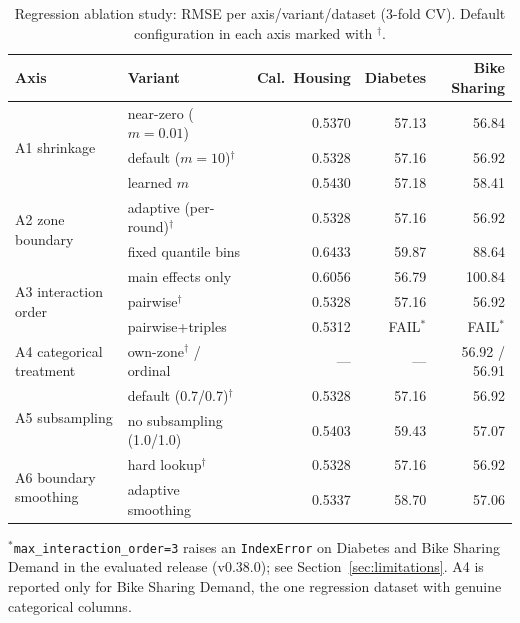 \documentclass[11pt]{article}
\begin{document}
\begin{table}[t]
\centering
\small
\caption{Regression ablation study: RMSE per axis/variant/dataset (3-fold
CV). Default configuration in each axis marked with $^\dagger$.}
\label{tab:ablation-reg}
\begin{tabular}{llrrr}
\toprule
Axis & Variant & Cal.\ Housing & Diabetes & Bike Sharing \\
\midrule
\multirow{3}{*}{A1 shrinkage}
 & near-zero ($m=0.01$)   & 0.5370 & 57.13 & 56.84 \\
 & default ($m=10$)$^\dagger$ & 0.5328 & 57.16 & 56.92 \\
 & learned $m$             & 0.5430 & 57.18 & 58.41 \\
\midrule
\multirow{2}{*}{A2 zone boundary}
 & adaptive (per-round)$^\dagger$ & 0.5328 & 57.16 & 56.92 \\
 & fixed quantile bins      & 0.6433 & 59.87 & 88.64 \\
\midrule
\multirow{3}{*}{A3 interaction order}
 & main effects only        & 0.6056 & 56.79 & 100.84 \\
 & pairwise$^\dagger$        & 0.5328 & 57.16 & 56.92 \\
 & pairwise+triples          & 0.5312 & FAIL$^*$ & FAIL$^*$ \\
\midrule
A4 categorical treatment & own-zone$^\dagger$ / ordinal & --- & --- & 56.92 / 56.91 \\
\midrule
\multirow{2}{*}{A5 subsampling}
 & default (0.7/0.7)$^\dagger$ & 0.5328 & 57.16 & 56.92 \\
 & no subsampling (1.0/1.0)   & 0.5403 & 59.43 & 57.07 \\
\midrule
\multirow{2}{*}{A6 boundary smoothing}
 & hard lookup$^\dagger$      & 0.5328 & 57.16 & 56.92 \\
 & adaptive smoothing         & 0.5337 & 58.70 & 57.06 \\
\bottomrule
\end{tabular}

\vspace{2pt}
\footnotesize $^*$\texttt{max\_interaction\_order=3} raises an
\texttt{IndexError} on Diabetes and Bike Sharing Demand in the evaluated
release (v0.38.0); see Section~\ref{sec:limitations}. A4 is reported only
for Bike Sharing Demand, the one regression dataset with genuine
categorical columns.
\end{table}
\end{document}
